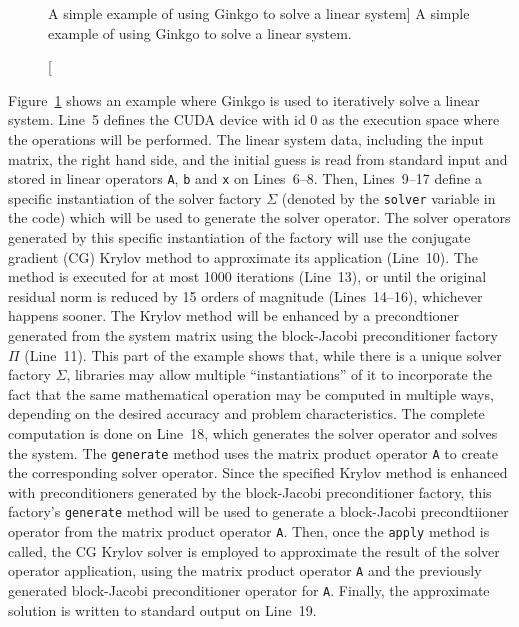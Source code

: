 \begin{figure}
\begin{center}

\end{center}
\caption
[A simple example of using Ginkgo to solve a linear system]
{A simple example of using Ginkgo to solve a linear system.}
\label{conclusion:fig:ginkgo-example}
\end{figure}

Figure~\ref{conclusion:fig:ginkgo-example} shows an example where Ginkgo is used
to iteratively solve a linear system. Line~5 defines the CUDA device with id 0
as the execution space where the operations will be performed. The linear system
data, including the input matrix, the right hand side, and the initial guess is
read from standard input and stored in linear operators \texttt{A}, \texttt{b}
and \texttt{x} on Lines~6--8. Then, Lines~9--17 define a specific instantiation
of the solver factory $\Sigma$ (denoted by the \texttt{solver} variable in the
code) which will be used to generate the solver operator. The solver operators
generated by this specific instantiation of the factory will use the conjugate
gradient (CG) Krylov method to approximate its application (Line~10). The method
is executed for at most 1000 iterations (Line~13), or until the original
residual norm is reduced by 15 orders of magnitude (Lines~14--16), whichever
happens sooner. The Krylov method will be enhanced by a precondtioner generated
from the system matrix using the block-Jacobi preconditioner factory $\Pi$
(Line~11). This part of the example shows that, while there is a unique solver
factory $\Sigma$, libraries may allow multiple ``instantiations'' of it to
incorporate the fact that the same mathematical operation may be computed in
multiple ways, depending on the desired accuracy and problem characteristics.
The complete computation is done on Line~18, which generates the solver operator
and solves the system. The \texttt{generate} method uses the matrix product
operator \texttt{A} to create the corresponding solver operator.
Since the specified Krylov method is enhanced with preconditioners generated
by the block-Jacobi preconditioner factory, this factory's \texttt{generate}
method will be used to generate a block-Jacobi precondtiioner operator from the
matrix product operator \texttt{A}. Then, once the \texttt{apply} method is
called, the CG Krylov solver is employed to approximate the result of the solver
operator application, using the matrix product operator \texttt{A} and the
previously generated block-Jacobi preconditioner operator for \texttt{A}.
Finally, the approximate solution is written to standard output on Line~19.

